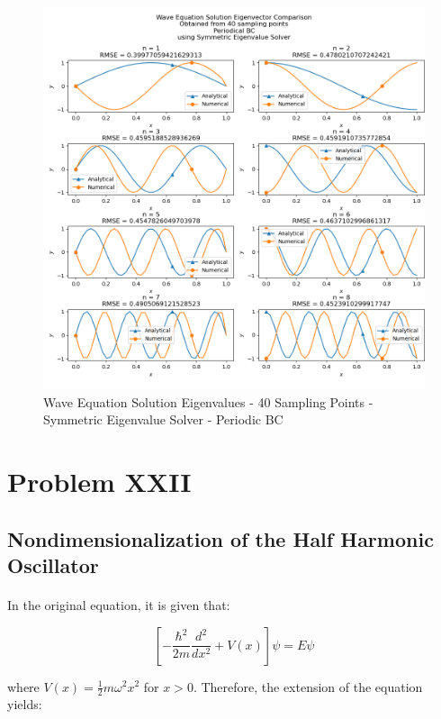 \documentclass[letterpaper,12pt]{article}
\begin{document}
\begin{figure}[H]
\centerline{\includegraphics[width=\linewidth]{figures/6_40_Symmetric_Eigenvalue_Solver_p_eigenvector.png}}
\caption{Wave Equation Solution Eigenvalues - 40 Sampling Points - Symmetric Eigenvalue Solver - Periodic BC}
\label{fig:6_40_Symmetric_Eigenvalue_Solver_p_eigenvector}
\end{figure}

\section{Problem XXII}
\subsection{Nondimensionalization of the Half Harmonic Oscillator}
\paragraph{} In the original equation, it is given that:

\begin{equation*}
    \left[-\frac{\hbar^2}{2m} \frac{d^2}{dx^2} + V(x)\right]\psi = E \psi
\end{equation*}

where $V(x) = \frac{1}{2}m\omega^2x^2$ for $x>0$. Therefore, the extension of the equation yields:
\end{document}
